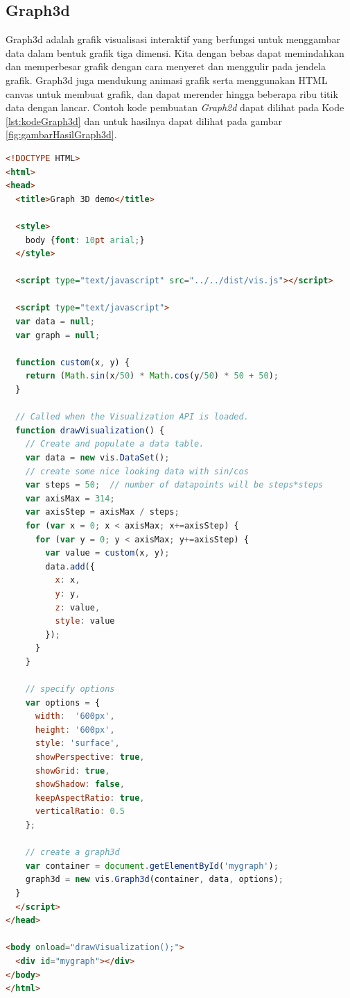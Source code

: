 \newpage
\subsection{Graph3d}
Graph3d adalah grafik visualisasi interaktif yang berfungsi untuk menggambar data dalam bentuk grafik tiga dimensi. Kita dengan bebas dapat memindahkan dan memperbesar grafik dengan cara menyeret dan menggulir pada jendela grafik. Graph3d juga mendukung animasi grafik serta menggunakan HTML canvas untuk membuat grafik, dan dapat merender hingga beberapa ribu titik data dengan lancar. Contoh kode pembuatan \textit{Graph2d} dapat dilihat pada Kode \ref{lst:kodeGraph3d} dan untuk hasilnya dapat dilihat pada gambar \ref{fig:gambarHasilGraph3d}.

\begin{lstlisting}[language=HTML, caption=Contoh kode untuk membuat \textit{graph3d} menggunakan \textit{vis.js}\label{lst:kodeGraph3d}]
<!DOCTYPE HTML>
<html>
<head>
  <title>Graph 3D demo</title>

  <style>
    body {font: 10pt arial;}
  </style>

  <script type="text/javascript" src="../../dist/vis.js"></script>

  <script type="text/javascript">
  var data = null;
  var graph = null;

  function custom(x, y) {
    return (Math.sin(x/50) * Math.cos(y/50) * 50 + 50);
  }

  // Called when the Visualization API is loaded.
  function drawVisualization() {
    // Create and populate a data table.
    var data = new vis.DataSet();
    // create some nice looking data with sin/cos
    var steps = 50;  // number of datapoints will be steps*steps
    var axisMax = 314;
    var axisStep = axisMax / steps;
    for (var x = 0; x < axisMax; x+=axisStep) {
      for (var y = 0; y < axisMax; y+=axisStep) {
        var value = custom(x, y);
        data.add({
          x: x,
          y: y,
          z: value,
          style: value
        });
      }
    }

    // specify options
    var options = {
      width:  '600px',
      height: '600px',
      style: 'surface',
      showPerspective: true,
      showGrid: true,
      showShadow: false,
      keepAspectRatio: true,
      verticalRatio: 0.5
    };

    // create a graph3d
    var container = document.getElementById('mygraph');
    graph3d = new vis.Graph3d(container, data, options);
  }
  </script>
</head>

<body onload="drawVisualization();">
  <div id="mygraph"></div>
</body>
</html>
\end{lstlisting}

